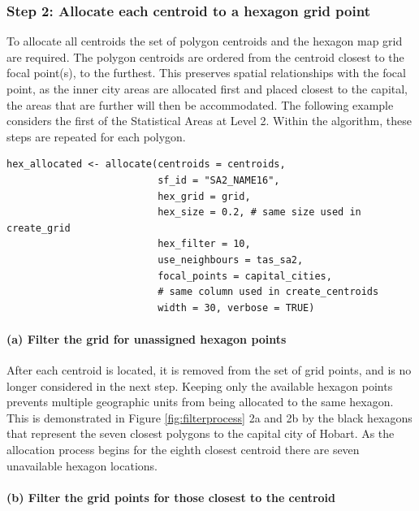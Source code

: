 \hypertarget{step-2-allocate-each-centroid-to-a-hexagon-grid-point}{%
\subsubsection{Step 2: Allocate each centroid to a hexagon grid point}\label{step-2-allocate-each-centroid-to-a-hexagon-grid-point}}

To allocate all centroids the set of polygon centroids and the hexagon map grid are required. The polygon centroids are ordered from the centroid closest to the focal point(s), to the furthest. This preserves spatial relationships with the focal point, as the inner city areas are allocated first and placed closest to the capital, the areas that are further will then be accommodated. The following example considers the first of the Statistical Areas at Level 2. Within the algorithm, these steps are repeated for each polygon.

\begin{verbatim}
hex_allocated <- allocate(centroids = centroids,
                          sf_id = "SA2_NAME16",
                          hex_grid = grid,
                          hex_size = 0.2, # same size used in create_grid
                          hex_filter = 10,
                          use_neighbours = tas_sa2,
                          focal_points = capital_cities,
                          # same column used in create_centroids
                          width = 30, verbose = TRUE)
\end{verbatim}

\hypertarget{a-filter-the-grid-for-unassigned-hexagon-points}{%
\paragraph{(a) Filter the grid for unassigned hexagon points}\label{a-filter-the-grid-for-unassigned-hexagon-points}}

After each centroid is located, it is removed from the set of grid points, and is no longer considered in the next step. Keeping only the available hexagon points prevents multiple geographic units from being allocated to the same hexagon. This is demonstrated in Figure \ref{fig:filterprocess} 2a and 2b by the black hexagons that represent the seven closest polygons to the capital city of Hobart. As the allocation process begins for the eighth closest centroid there are seven unavailable hexagon locations.

\hypertarget{b-filter-the-grid-points-for-those-closest-to-the-centroid}{%
\paragraph{(b) Filter the grid points for those closest to the centroid}\label{b-filter-the-grid-points-for-those-closest-to-the-centroid}}

